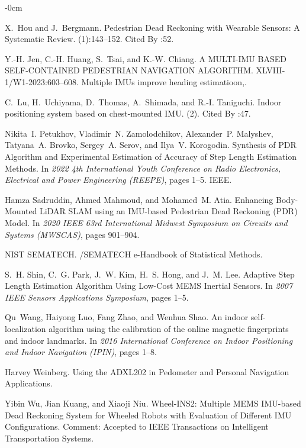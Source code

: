 \documentclass[engproc,conferenceproceedings,submit,pdftex,moreauthors]{Definitions/mdpi}
\begin{document}
\begin{adjustwidth}{-\extralength}{0cm}
\begin{thebibliography}{999}
X.~Hou and J.~Bergmann.
\newblock Pedestrian {{Dead Reckoning}} with {{Wearable Sensors}}: {{A
		Systematic Review}}.
(1):143--152.
\newblock Cited By :52.

Y.-H. Jen, C.-H. Huang, S.~Tsai, and K.-W. Chiang.
\newblock A {{MULTI-IMU BASED SELF-CONTAINED PEDESTRIAN NAVIGATION ALGORITHM}}.
\newblock XLVIII-1/W1-2023:603--608.
\newblock Multiple IMUs improve heading estimatioon,.

C.~Lu, H.~Uchiyama, D.~Thomas, A.~Shimada, and R.-I. Taniguchi.
\newblock Indoor positioning system based on chest-mounted {{IMU}}.
(2).
\newblock Cited By :47.

Nikita~I. Petukhov, Vladimir~N. Zamolodchikov, Alexander~P. Malyshev,
Tatyana~A. Brovko, Sergey~A. Serov, and Ilya~V. Korogodin.
\newblock Synthesis of {{PDR Algorithm}} and {{Experimental Estimation}} of
{{Accuracy}} of {{Step Length Estimation Methods}}.
\newblock In {\em 2022 4th {{International Youth Conference}} on {{Radio
			Electronics}}, {{Electrical}} and {{Power Engineering}} ({{REEPE}})}, pages
1--5. {IEEE}.

Hamza Sadruddin, Ahmed Mahmoud, and Mohamed~M. Atia.
\newblock Enhancing {{Body-Mounted LiDAR SLAM}} using an {{IMU-based Pedestrian
		Dead Reckoning}} ({{PDR}}) {{Model}}.
\newblock In {\em 2020 {{IEEE}} 63rd {{International Midwest Symposium}} on
	{{Circuits}} and {{Systems}} ({{MWSCAS}})}, pages 901--904.

NIST SEMATECH.
/{{SEMATECH}} e-{{Handbook}} of {{Statistical Methods}}.

S.~H. Shin, C.~G. Park, J.~W. Kim, H.~S. Hong, and J.~M. Lee.
\newblock Adaptive {{Step Length Estimation Algorithm Using Low-Cost MEMS
		Inertial Sensors}}.
\newblock In {\em 2007 {{IEEE Sensors Applications Symposium}}}, pages 1--5.

Qu~Wang, Haiyong Luo, Fang Zhao, and Wenhua Shao.
\newblock An indoor self-localization algorithm using the calibration of the
online magnetic fingerprints and indoor landmarks.
\newblock In {\em 2016 {{International Conference}} on {{Indoor Positioning}}
	and {{Indoor Navigation}} ({{IPIN}})}, pages 1--8.

Harvey Weinberg.
\newblock Using the {{ADXL202}} in {{Pedometer}} and {{Personal Navigation
		Applications}}.

Yibin Wu, Jian Kuang, and Xiaoji Niu.
\newblock Wheel-{{INS2}}: {{Multiple MEMS IMU-based Dead Reckoning System}} for
{{Wheeled Robots}} with {{Evaluation}} of {{Different IMU Configurations}}.
\newblock Comment: Accepted to IEEE Transactions on Intelligent Transportation
Systems.


\end{thebibliography}
\end{adjustwidth}
\end{document}
